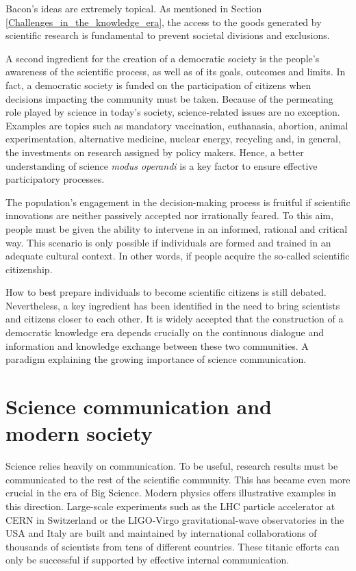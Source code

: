 Bacon's ideas are extremely topical. As mentioned in Section \ref{Challenges_in_the_knowledge_era}, the access to the goods generated by scientific research is fundamental to prevent societal divisions and exclusions.

A second ingredient for the creation of a democratic society is the people's awareness of the scientific process, as well as of its goals, outcomes and limits. In fact, a democratic society is funded on the participation of citizens when decisions impacting the community must be taken. Because of the permeating role played by science in today's society, science-related issues are no exception. Examples are topics such as mandatory vaccination, euthanasia, abortion, animal experimentation, alternative medicine, nuclear energy, recycling and, in general, the investments on research assigned by policy makers. Hence, a better understanding of science \textit{modus operandi} is a key factor to ensure effective participatory processes.    

The population's engagement in the decision-making process is fruitful if scientific innovations are neither passively accepted nor irrationally feared. To this aim, people must be given the ability to intervene in an informed, rational and critical way. This scenario is only possible if individuals are formed and trained in an adequate cultural context. In other words, if people acquire the so-called scientific citizenship.

How to best prepare individuals to become scientific citizens is still debated. Nevertheless, a key ingredient has been identified in the need to bring scientists and citizens closer to each other. It is widely accepted that the construction of a democratic knowledge era depends crucially on the continuous dialogue and information and knowledge exchange between these two communities. A paradigm explaining the growing importance of science communication.

\section{Science communication and modern society}    
Science relies heavily on communication. To be useful, research results must be communicated to the rest of the scientific community. This has became even more crucial in the era of Big Science. Modern physics offers illustrative examples in this direction. Large-scale experiments such as the LHC particle accelerator at CERN in Switzerland or the LIGO-Virgo gravitational-wave observatories in the USA and Italy are built and maintained by international collaborations of thousands of scientists from tens of different countries. These titanic efforts can only be successful if supported by effective internal communication.  

